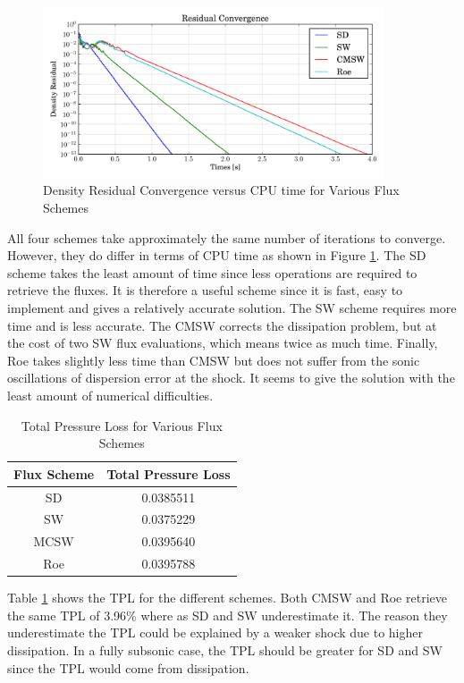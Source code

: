 \documentclass[letterpaper,12pt,]{article}
\begin{document}
\begin{figure}[!ht]
    \centering
    \includegraphics[width = 0.9\textwidth]{./figures/q4t.pdf}
    \caption {Density Residual Convergence versus CPU time for Various Flux Schemes}
    \label{fig:q4t}
\end{figure}


All four schemes take approximately the same number of iterations to converge. However, they do differ in terms of CPU time as shown in Figure \ref{fig:q4t}.
The SD scheme takes the least amount of time since less operations are required to retrieve the fluxes.
It is therefore a useful scheme since it is fast, easy to implement and gives a relatively accurate solution.
The SW scheme requires more time and is less accurate.
The CMSW corrects the dissipation problem, but at the cost of two SW flux evaluations, which means twice as much time.
Finally, Roe takes slightly less time than CMSW but does not suffer from the sonic oscillations of dispersion error at the shock.
It seems to give the solution with the least amount of numerical difficulties.

\begin{table}[!h]
\centering
\begin{tabular}{cc} \toprule
    {Flux Scheme} & {Total Pressure Loss} \\
    \midrule
    {SD}   & 0.0385511\\
    {SW}   & 0.0375229\\
    {MCSW} & 0.0395640\\
    {Roe}  & 0.0395788\\
\bottomrule
\end{tabular}
\caption{Total Pressure Loss for Various Flux Schemes}
\label{tab2}
\end{table}

Table \ref{tab2} shows the TPL for the different schemes.
Both CMSW and Roe retrieve the same TPL of 3.96\% where as SD and SW underestimate it.
The reason they underestimate the TPL could be explained by a weaker shock due to higher dissipation.
In a fully subsonic case, the TPL should be greater for SD and SW since the TPL would come from dissipation.
\end{document}
